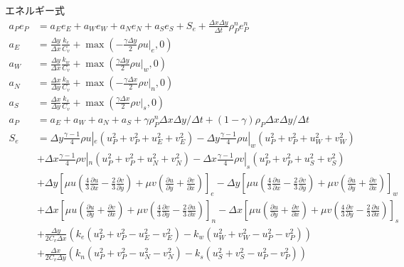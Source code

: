 \documentclass[a4paper,10pt,fleqn]{jsarticle}
\begin{document}
エネルギー式
\begin{align}
   a_Pe_P&=a_E e_E + a_W e_W + a_N e_N+a_S e_S +S_e +\frac{\Delta x\Delta
 y}{\Delta t}\rho_P^n e_P^n \\
a_E &= \frac{\Delta y}{\Delta x}\frac{k_e}{C_v} + \max(-\frac{\gamma\Delta
 y}{2} \rho u|_e, 0)\\
a_W &=  \frac{\Delta y}{\Delta x}\frac{k_w}{C_v} + \max(\frac{\gamma\Delta
 y}{2} \rho u|_w, 0)\\
 a_N &= \frac{\Delta x}{\Delta y}\frac{k_n}{C_v} + \max(-\frac{\gamma\Delta
 x}{2} \rho v|_n, 0)\\
 a_S &= \frac{\Delta x}{\Delta y}\frac{k_s}{C_v} + \max(\frac{\gamma\Delta
 x}{2} \rho v|_s, 0) \\
a_P &= a_E +a_W + a_N + a_S + \gamma\rho_P^n \Delta x \Delta y/\Delta t
 +(1-\gamma)\rho_P \Delta x \Delta y/\Delta t\\
S_e &= \Delta y \frac{\gamma-1}{4}\rho u|_e(u_P^2+v_P^2 + u_E^2+v_E^2)
- \Delta y \frac{\gamma-1}{4}\rho u|_w(u_P^2+v_P^2 + u_W^2+v_W^2)
\nonumber \\
& + \Delta x \frac{\gamma-1}{4}\rho v|_n(u_P^2+v_P^2 + u_N^2+v_N^2)
 - \Delta x \frac{\gamma-1}{4}\rho v|_s(u_P^2+v_P^2 + u_S^2+v_S^2)
\nonumber \\
& + \Delta y\left[\mu u \left(\frac{4}{3}\frac{\partial u}{\partial x} -
 \frac{2}{3}\frac{\partial v}{\partial y}\right) + \mu v\left( \frac{\partial u}{\partial y} +
 \frac{\partial v}{\partial x}\right)\right]_e
- \Delta y\left[\mu u \left(\frac{4}{3}\frac{\partial u}{\partial x} -
 \frac{2}{3}\frac{\partial v}{\partial y}\right) + \mu v\left( \frac{\partial u}{\partial y} +
 \frac{\partial v}{\partial x}\right)\right]_w
\nonumber \\
&+ \Delta x\left[\mu u \left(\frac{\partial u}{\partial y} +
 \frac{\partial v}{\partial x}\right) +  \mu v\left(\frac{4}{3}\frac{\partial v}{\partial y} -
 \frac{2}{3}\frac{\partial u}{\partial x}\right)\right]_n
-  \Delta x\left[\mu u \left(\frac{\partial u}{\partial y} +
 \frac{\partial v}{\partial x}\right) +  \mu v\left(\frac{4}{3}\frac{\partial v}{\partial y} -
 \frac{2}{3}\frac{\partial u}{\partial x}\right)\right]_s
\nonumber \\
& + \frac{\Delta y}{2C_v\Delta x}(k_e(u_P^2+v_P^2 - u_E^2 
- v_E^2) -k_w(u_W^2+v_W^2-u_P^2-v_P^2)) 
\nonumber\\
& +\frac{\Delta x}{2C_v\Delta y}(k_n(u_P^2+v_P^2 - u_N^2 
- v_N^2) -k_s(u_S^2+v_S^2-u_P^2-v_P^2)) 
\end{align}
\end{document}

